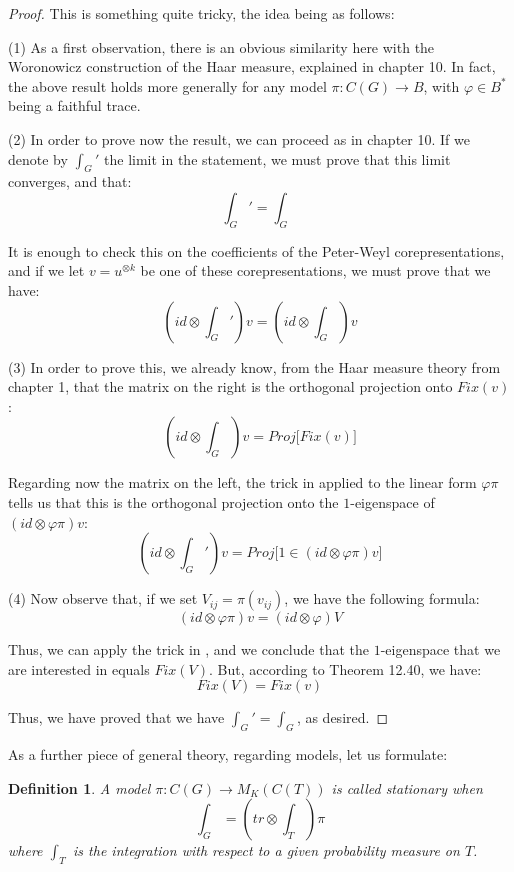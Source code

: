 \documentclass[12pt]{amsbook}
\newtheorem{definition}[theorem]{Definition}
\begin{document}
\begin{proof}
This is something quite tricky, the idea being as follows:

\medskip

(1) As a first observation, there is an obvious similarity here with the Woronowicz construction of the Haar measure, explained in chapter 10. In fact, the above result holds more generally for any model $\pi:C(G)\to B$, with $\varphi\in B^*$ being a faithful trace.

\medskip

(2) In order to prove now the result, we can proceed as in chapter 10. If we denote by $\int_G'$ the limit in the statement, we must prove that this limit converges, and that:
$$\int_G'=\int_G$$

It is enough to check this on the coefficients of the Peter-Weyl corepresentations, and if we let $v=u^{\otimes k}$ be one of these corepresentations, we must prove that we have:
$$\left(id\otimes\int_G'\right)v=\left(id\otimes\int_G\right)v$$

(3) In order to prove this, we already know, from the Haar measure theory from chapter 1, that the matrix on the right is the orthogonal projection onto $Fix(v)$:
$$\left(id\otimes\int_G\right)v=Proj\Big[Fix(v)\Big]$$

Regarding now the matrix on the left, the trick in \cite{wo1} applied to the linear form $\varphi\pi$ tells us that this is the orthogonal projection onto the $1$-eigenspace of $(id\otimes\varphi\pi)v$:
$$\left(id\otimes\int_G'\right)v=Proj\Big[1\in (id\otimes\varphi\pi)v\Big]$$

(4) Now observe that, if we set $V_{ij}=\pi(v_{ij})$, we have the following formula:
$$(id\otimes\varphi\pi)v=(id\otimes\varphi)V$$

Thus, we can apply the trick in \cite{wo1}, and we conclude that the $1$-eigenspace that we are interested in equals $Fix(V)$. But, according to Theorem 12.40, we have:
$$Fix(V)=Fix(v)$$

Thus, we have proved that we have $\int_G'=\int_G$, as desired.
\end{proof}

As a further piece of general theory, regarding models, let us formulate:

\begin{definition}
A model $\pi:C(G)\to M_K(C(T))$ is called stationary when
$$\int_G=\left(tr\otimes\int_T\right)\pi$$
where $\int_T$ is the integration with respect to a given probability measure on $T$.
\end{definition}
\end{document}
